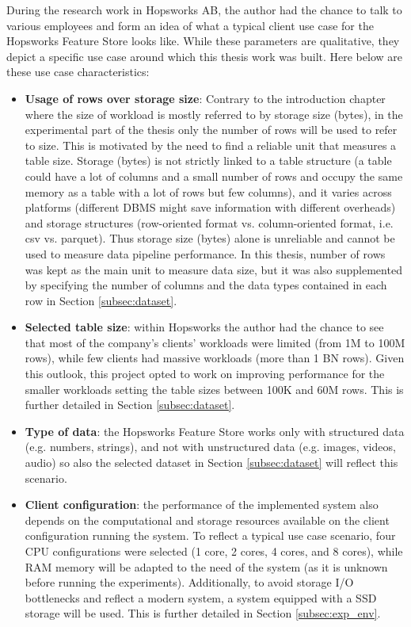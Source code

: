 During the research work in Hopsworks \gls{AB}, the author had the chance to talk to various employees and form an idea of what a typical client use case for the Hopsworks Feature Store looks like. While these parameters are qualitative, they depict a specific use case around which this thesis work was built. Here below are these use case characteristics:
\begin{itemize}
  \item \textbf{Usage of rows over storage size}: Contrary to the introduction chapter where the size of workload is mostly referred to by storage size (bytes), in the experimental part of the thesis only the number of rows will be used to refer to size. This is motivated by the need to find a reliable unit that measures a table size. Storage (bytes) is not strictly linked to a table structure (a table could have a lot of columns and a small number of rows and occupy the same memory as a table with a lot of rows but few columns), and it varies across platforms (different \gls{DBMS} might save information with different overheads) and storage structures (row-oriented format vs. column-oriented format, i.e. csv vs. parquet). Thus storage size (bytes) alone is unreliable and cannot be used to measure data pipeline performance. In this thesis, number of rows was kept as the main unit to measure data size, but it was also supplemented by specifying the number of columns and the data types contained in each row in Section \ref{subsec:dataset}.
  \item \textbf{Selected table size}: within Hopsworks the author had the chance to see that most of the company's clients' workloads were limited (from 1M to 100M rows), while few clients had massive workloads (more than 1 BN rows). Given this outlook, this project opted to work on improving performance for the smaller workloads setting the table sizes between 100K and 60M rows. This is further detailed in Section \ref{subsec:dataset}.
  \item \textbf{Type of data}: the Hopsworks Feature Store works only with structured data (e.g. numbers, strings), and not with unstructured data (e.g. images, videos, audio) so also the selected dataset in Section \ref{subsec:dataset} will reflect this scenario.
  \item \textbf{Client configuration}: the performance of the implemented system also depends on the computational and storage resources available on the client configuration running the system. To reflect a typical use case scenario, four \gls{CPU} configurations were selected (1 core, 2 cores, 4 cores, and 8 cores), while \gls{RAM} memory will be adapted to the need of the system (as it is unknown before running the experiments). Additionally, to avoid storage I/O bottlenecks and reflect a modern system, a system equipped with a \gls{SSD} storage will be used. This is further detailed in Section \ref{subsec:exp_env}.
\end{itemize}

